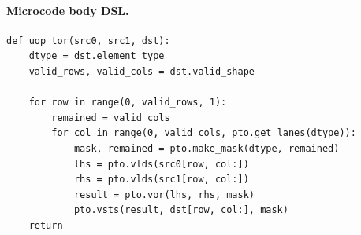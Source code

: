 \paragraph{Microcode body DSL.}
\begin{lstlisting}[style=ptocode]
def uop_tor(src0, src1, dst):
    dtype = dst.element_type
    valid_rows, valid_cols = dst.valid_shape

    for row in range(0, valid_rows, 1):
        remained = valid_cols
        for col in range(0, valid_cols, pto.get_lanes(dtype)):
            mask, remained = pto.make_mask(dtype, remained)
            lhs = pto.vlds(src0[row, col:])
            rhs = pto.vlds(src1[row, col:])
            result = pto.vor(lhs, rhs, mask)
            pto.vsts(result, dst[row, col:], mask)
    return
\end{lstlisting}
\Needspace{0.34\textheight}
